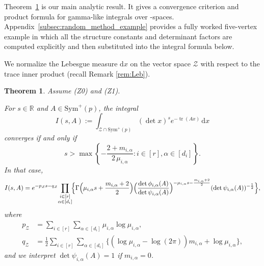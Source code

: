 \documentclass[12pt]{amsart}
\theoremstyle{plain}
\newtheorem{theorem}{Theorem}[section]
\theoremstyle{definition}
\theoremstyle{remark}
\newcommand{\1}{\mathbf{1}}
\newcommand{\dd}{\mathrm{d}}
\newcommand{\tr}{\operatorname{tr}}
\begin{document}
Theorem~\ref{thm:integral} is our main analytic result. It gives a
convergence criterion and product formula for gamma-like integrals over
\BC-spaces. Appendix~\ref{subsec:random_method_example} provides a fully
worked five-vertex example in which all the structure constants and
determinant factors are computed explicitly and then substituted into the
integral formula below.

We normalize the Lebesgue measure $\dd x$ on the vector space $\mathcal{Z}$  with respect to the trace inner product (recall Remark \ref{rem:Leb}).
%


\begin{theorem} \label{thm:integral}
Assume (Z0) and (Z1). 

For $s\in\mathbb{R}$ and $A \in \mathrm{Sym}^+(p)$, 
 the integral 
\[
I(s,A)
:=\int_{\mathcal{Z} \cap \mathrm{Sym}^+(p)}(\det x)^s  e^{- \tr(Ax) } \,\dd x
\]
converges
if and only if 
\[
s > \max\left\{-\frac{2+m_{i,\alpha}}{2\,\mu_{i,\alpha}}\colon i\in[r], \alpha\in[d_i]\right\}.
\]
In that case,
\[
I(s,A)=e^{-p_{\mathcal{Z}}s-q_{\mathcal{Z}}}\!
  \prod_{\substack{i\in[r]\\ \alpha\in[d_i]}}\!
  \Bigl\{\Gamma\Bigl(\mu_{i,\alpha}s + \frac{m_{i,\alpha}+2}{2}\Bigr)
 \Bigl( \frac{\det \phi_{i,\alpha}(A) }{ \det \psi_{i,\alpha}(A) }
 \Bigr)^{-\mu_{i,\alpha}s - \frac{m_{i,\alpha}+2}{2}}
 (\det \psi_{i,\alpha}(A) )^{-\frac12}
\Bigr\},
\]
where 
\begin{align*}
p_{\mathcal{Z}} 
&=\sum_{i\in[r]} \sum_{\alpha\in[d_i]} \mu_{i,\alpha} \log \mu_{i,\alpha},\\
q_{\mathcal{Z}}
&= \frac12 \sum_{i\in[r]} \sum_{\alpha\in[d_i]} 
 \{ (\log \mu_{i,\alpha} - \log(2\pi)) m_{i,\alpha} +\log \mu_{i,\alpha} \},  
\end{align*} 
 and we interpret $\det \psi_{i,\alpha}(A) = 1$ if $m_{i,\alpha} = 0$.
\end{theorem}
\end{document}
